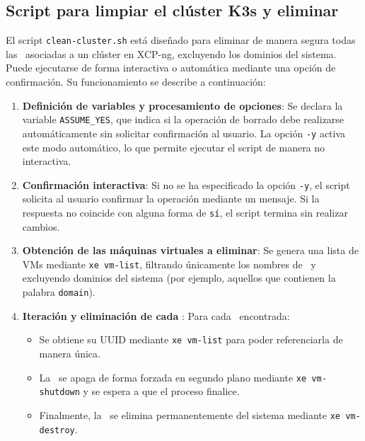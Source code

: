 \subsection{Script para limpiar el clúster K3s y eliminar \VM}
\noindent
El script \texttt{clean-cluster.sh} está diseñado para eliminar de manera segura todas las \VM\ asociadas a un clúster en XCP-ng, excluyendo los dominios del sistema. Puede ejecutarse de forma interactiva o automática mediante una opción de confirmación. Su funcionamiento se describe a continuación:

\begin{enumerate}
    \item \textbf{Definición de variables y procesamiento de opciones}:  
    Se declara la variable \texttt{ASSUME\_YES}, que indica si la operación de borrado debe realizarse automáticamente sin solicitar confirmación al usuario.  
    La opción \texttt{-y} activa este modo automático, lo que permite ejecutar el script de manera no interactiva.

    \item \textbf{Confirmación interactiva}:  
    Si no se ha especificado la opción \texttt{-y}, el script solicita al usuario confirmar la operación mediante un mensaje. Si la respuesta no coincide con alguna forma de \texttt{sí}, el script termina sin realizar cambios.

    \item \textbf{Obtención de las máquinas virtuales a eliminar}:  
    Se genera una lista de VMs mediante \texttt{xe vm-list}, filtrando únicamente los nombres de \VM\ y excluyendo dominios del sistema (por ejemplo, aquellos que contienen la palabra \texttt{domain}).  

    \item \textbf{Iteración y eliminación de cada \VM}:  
    Para cada \VM\ encontrada:
    \begin{itemize}
        \item Se obtiene su UUID mediante \texttt{xe vm-list} para poder referenciarla de manera única.
        \item La \VM\ se apaga de forma forzada en segundo plano mediante \texttt{xe vm-shutdown} y se espera a que el proceso finalice.
        \item Finalmente, la \VM\ se elimina permanentemente del sistema mediante \texttt{xe vm-destroy}.
    \end{itemize}
\end{enumerate}




